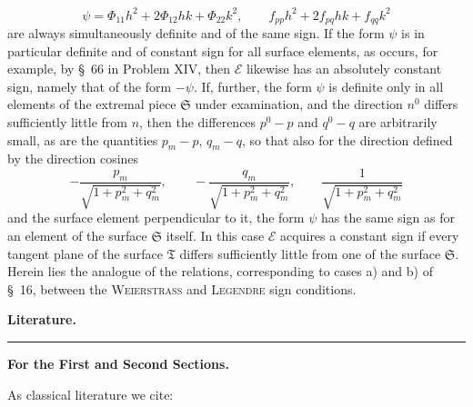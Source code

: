 \documentclass[11pt,a4paper,leqno]{article}
\begin{document}
\[
\psi=\Phi_{11}h^2+2\Phi_{12}hk+\Phi_{22}k^2,\qquad
f_{pp}h^2+2f_{pq}hk+f_{qq}k^2
\]
are always simultaneously definite and of the same sign. If the form $\psi$
is in particular definite and of constant sign for all surface elements, as
occurs, for example, by \S~66 in Problem XIV, then $\mathcal{E}$ likewise has
an absolutely constant sign, namely that of the form $-\psi$. If, further,
the form $\psi$ is definite only in all elements of the extremal piece
$\mathfrak{S}$ under examination, and the direction $n^0$ differs
sufficiently little from $n$, then the differences $p^0-p$ and $q^0-q$ are
arbitrarily small, as are the quantities $p_m-p$, $q_m-q$, so that also for
the direction defined by the direction cosines
\[
-\frac{p_m}{\sqrt{1+p_m^2+q_m^2}},\qquad
-\frac{q_m}{\sqrt{1+p_m^2+q_m^2}},\qquad
\frac{1}{\sqrt{1+p_m^2+q_m^2}}
\]
and the surface element perpendicular to it, the form $\psi$ has the same
sign as for an element of the surface $\mathfrak{S}$ itself. In this case
$\mathcal{E}$ acquires a constant sign if every tangent plane of the surface
$\mathfrak{T}$ differs sufficiently little from one of the surface
$\mathfrak{S}$. Herein lies the analogue of the relations, corresponding to
cases a) and b) of \S~16, between the \textsc{Weierstrass} and \textsc{Legendre} sign
conditions.


\begin{center}
{\Large\bfseries Literature.}

\rule{2.4cm}{0.4pt}

{\large\bfseries For the First and Second Sections.}
\end{center}

\noindent As classical literature we cite:
\end{document}
